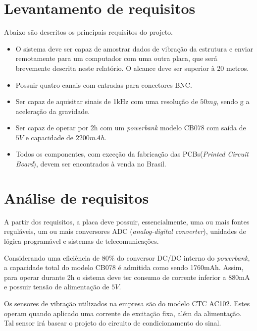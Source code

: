 \documentclass[11pt]{abntex2}
\begin{document}
			\section{Levantamento de requisitos}
				Abaixo são descritos os principais requisitos do projeto.

				\begin{itemize}
					\item O sistema deve ser capaz de amostrar dados de vibração da
					estrutura e enviar remotamente para um computador com uma outra
					placa, que será brevemente descrita neste relatório. O alcance
					deve ser superior à 20 metros.
					
					\item Possuir quatro canais com entradas para conectores BNC.
					
					\item Ser capaz de aquisitar sinais de 1kHz com uma resolução de $50mg$, sendo g
					a aceleração da gravidade.
					
					\item Ser capaz de operar por 2h com um \textit{powerbank} modelo CB078 com saída de $5V$
					e capacidade de $2200mAh$.
					
					\item Todos os componentes, com exceção da fabricação das
					PCBs(\textit{Printed Circuit Board}), devem ser encontrados à
					venda no Brasil.
				\end{itemize}

			\section{Análise de requisitos}
			
				A partir dos requisitos, a placa deve possuir, essencialmente, uma
				ou mais fontes reguláveis, um ou mais conversores ADC
				(\textit{analog-digital converter}), unidades de lógica programável
				e sistemas de telecomunicações.

				Considerando uma eficiência de $80\%$ do conversor DC/DC interno do
				\textit{powerbank}, a capacidade total do modelo CB078 é admitida como sendo
				1760mAh. Assim, para operar durante 2h o sistema deve ter consumo de
				corrente inferior a 880mA e possuir tensão de alimentação de $5V$.
				
				Os sensores de vibração utilizados na empresa são do modelo CTC
				AC102. Estes operam quando aplicado uma corrente de excitação fixa,
				além da alimentação. Tal sensor irá basear o projeto do circuito de
				condicionamento do sinal.
				
\end{document}
